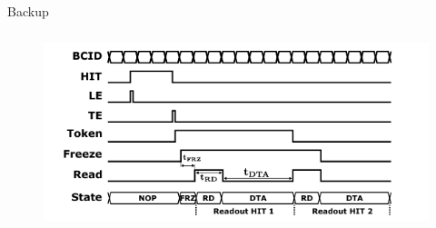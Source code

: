     \begin{frame}
        Backup        
    \end{frame} 





    \begin{frame}
        \frametitle{}
        \begin{figure}[h!]
            \centering
            \includegraphics[width=.8\linewidth]{figures/Monopix1/readout_timing.png}
        \end{figure}
    \end{frame} 

